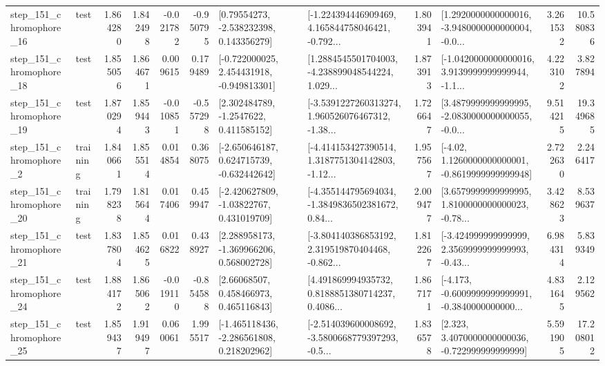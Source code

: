 \begin{tabular}{llrrrrllrlrr}
  step\_151\_chromophore\_16 &      test &      1.864280 &    1.842498 &     -0.021782 & -0.950795 &     [0.79554273, -2.538232398, 0.143356279] &  [-1.224394446909469, 4.165844758046421, -0.792... &       1.803941 &  [1.2920000000000016, -3.9480000000000004, -0.0... &            3.261532 &         10.580836 \\
  step\_151\_chromophore\_18 &      test &      1.855056 &    1.864671 &      0.009615 &  0.179489 &   [-0.722000025, 2.454431918, -0.949813301] &  [1.2884545501704003, -4.238899048544224, 1.029... &       1.873913 &  [-1.0420000000000016, 3.9139999999999944, -1.1... &            4.223102 &          3.827894 \\
  step\_151\_chromophore\_19 &      test &      1.870294 &    1.859443 &     -0.010851 & -0.557298 &      [2.302484789, -1.2547622, 0.411585152] &  [-3.5391227260313274, 1.960526076467312, -1.38... &       1.726647 &  [3.4879999999999995, -2.0830000000000055, -0.0... &            9.514215 &         19.349685 \\
   step\_151\_chromophore\_2 &  training &      1.840661 &    1.855514 &      0.014854 &  0.368075 &   [-2.650646187, 0.624715739, -0.632442642] &  [-4.414153427390514, 1.3187751304142803, -1.12... &       1.957567 &   [-4.02, 1.1260000000000001, -0.8619999999999948] &            2.722630 &          2.246417 \\
  step\_151\_chromophore\_20 &  training &      1.798238 &    1.815644 &      0.017406 &  0.459947 &    [-2.420627809, -1.03822767, 0.431019709] &  [-4.355144795694034, -1.3849836502381672, 0.84... &       2.009477 &  [3.6579999999999995, 1.8100000000000023, -0.78... &            3.428623 &          8.539637 \\
  step\_151\_chromophore\_21 &      test &      1.837804 &    1.854625 &      0.016822 &  0.438927 &    [2.288958173, -1.369966206, 0.568002728] &  [-3.804140386853192, 2.319519870404468, -0.862... &       1.812267 &  [-3.424999999999999, 2.3569999999999993, -0.43... &            6.984314 &          5.839349 \\
  step\_151\_chromophore\_24 &      test &      1.884172 &    1.865062 &     -0.019110 & -0.854588 &      [2.66068507, 0.458466973, 0.465116843] &  [4.491869994935732, 0.8188851380714237, 0.4086... &       1.867171 &  [-4.173, -0.6009999999999991, -0.3840000000000... &            4.831645 &          2.129562 \\
  step\_151\_chromophore\_25 &      test &      1.859437 &    1.919497 &      0.060061 &  1.995517 &   [-1.465118436, -2.286561808, 0.218202962] &  [-2.514039600008692, -3.5800668779397293, -0.5... &       1.836578 &    [2.323, 3.4070000000000036, -0.722999999999999] &            5.591905 &         17.208012 \\

\end{tabular}
